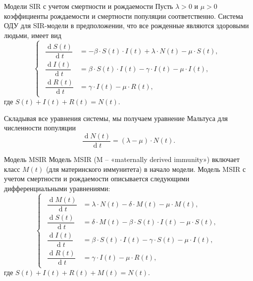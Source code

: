\documentclass[notheorems]{beamer}
\renewcommand{\d}{\operatorname{d}}
\begin{document}

\begin{frame}
	{Модели SIR с учетом смертности и рождаемости}
	Пусть $\lambda > 0$ и $\mu > 0$ коэффициенты рождаемости и смертности популяции соответственно. Система ОДУ для SIR-модели в предположении, что все рожденные являются здоровыми людьми, имеет вид 
	\begin{equation}
		\left\{ 
		\begin{gathered} 
			\begin{aligned}
				\dfrac {\d S(t)}{\d t} &= -\beta \cdot S(t) \cdot I(t) + \lambda\cdot N(t) - \mu\cdot S(t),\\
				\dfrac{\d I(t)}{\d t} &= \beta \cdot S(t)\cdot I(t) - \gamma\cdot I(t) - \mu\cdot I(t),\\
				\dfrac{\d R(t)}{\d t} &= \gamma\cdot I(t) - \mu \cdot R(t),
			\end{aligned}
		\end{gathered} 
		\right.
	\end{equation}
	где $S(t) + I(t) + R(t) = N(t).$
	
	Складывая все уравнения системы, мы получаем уравнение Мальтуса для численности популяции 
	\begin{equation}
		\dfrac{\d N(t)}{\d t} = (\lambda-\mu) \cdot N(t).
	\end{equation}
\end{frame}


\begin{frame}{Модель MSIR}
		Модель MSIR (M -- «maternally derived immunity») включает класс $M(t)$ (для материнского иммунитета) в начало модели. Модель MSIR с учетом смертности и рождаемости описывается следующими дифференциальными уравнениями:
	\begin{equation}
		\left\{ 
		\begin{gathered} 
			\begin{aligned}
				\dfrac {\d M(t)}{\d t} &= \lambda\cdot N(t) - \delta\cdot M(t)-\mu\cdot M(t),\\
				\dfrac {\d S(t)}{\d t} &= \delta \cdot M(t) -\beta\cdot S(t)\cdot I(t) - \mu \cdot S(t),\\
				\dfrac{\d I(t)}{\d t} &=\beta\cdot S(t)\cdot I(t) - \gamma \cdot S(t) - \mu \cdot I(t),\\
				\dfrac{\d R(t)}{\d t} &= \gamma\cdot I(t) - \mu \cdot R(t), 
			\end{aligned}
		\end{gathered} 
		\right.
	\end{equation}
	где $S(t) + I(t) + R(t) + M(t) = N(t).$
\end{frame}
\end{document}
